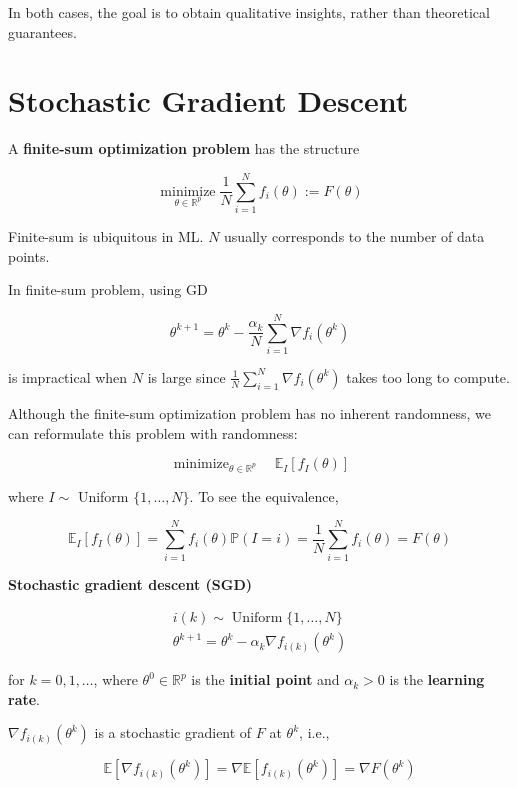 \documentclass{report}
\begin{document}
In both cases, the goal is to obtain qualitative insights, rather than theoretical guarantees.

\section{Stochastic Gradient Descent}

\begin{definition}
    A \textbf{finite-sum optimization problem} has the structure

    $$
    \underset{\theta \in \mathbb{R}^{p}}{\operatorname{minimize}} \frac{1}{N} \sum_{i=1}^{N} f_{i}(\theta):=F(\theta)
    $$

    Finite-sum is ubiquitous in ML. $N$ usually corresponds to the number of data points.
\end{definition}

In finite-sum problem, using GD

$$
\theta^{k+1}=\theta^{k}-\frac{\alpha_{k}}{N} \sum_{i=1}^{N} \nabla f_{i}\left(\theta^{k}\right)
$$

is impractical when $N$ is large since $\frac{1}{N} \sum_{i=1}^{N} \nabla f_{i}\left(\theta^{k}\right)$ takes too long to compute.

\begin{concept}
    Although the finite-sum optimization problem has no inherent randomness, we can reformulate this problem with randomness:

    $$
    \operatorname{minimize}_{\theta \in \mathbb{R}^{p}} \quad \mathbb{E}_{I}\left[f_{I}(\theta)\right]
    $$

    where $I \sim$ Uniform $\{1, \ldots, N\}$. To see the equivalence,

    $$
    \mathbb{E}_{I}\left[f_{I}(\theta)\right]=\sum_{i=1}^{N} f_{i}(\theta) \mathbb{P}(I=i)=\frac{1}{N} \sum_{i=1}^{N} f_{i}(\theta)=F(\theta)
    $$
\end{concept}

\begin{definition}
    \textbf{Stochastic gradient descent (SGD)}

    $$
    \begin{gathered}
    i(k) \sim \operatorname{Uniform}\{1, \ldots, N\} \\
    \theta^{k+1}=\theta^{k}-\alpha_{k} \nabla f_{i(k)}\left(\theta^{k}\right)
    \end{gathered}
    $$

    for $k=0,1, \ldots$, where $\theta^{0} \in \mathbb{R}^{p}$ is the \textbf{initial point} and $\alpha_{k}>0$ is the \textbf{learning rate}.

    $\nabla f_{i(k)}\left(\theta^{k}\right)$ is a stochastic gradient of $F$ at $\theta^{k}$, i.e.,

    $$
    \mathbb{E}\left[\nabla f_{i(k)}\left(\theta^{k}\right)\right]=\nabla \mathbb{E}\left[f_{i(k)}\left(\theta^{k}\right)\right]=\nabla F\left(\theta^{k}\right)
    $$
\end{definition}
\end{document}

